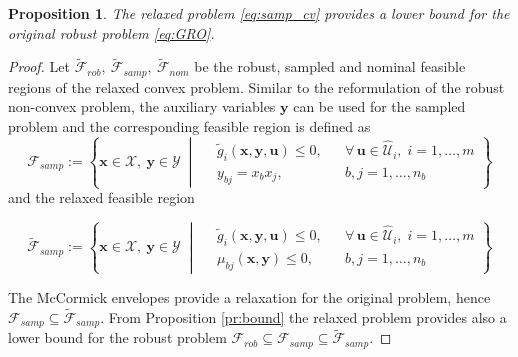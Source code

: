 \documentclass[sn-mathphys-num]{sn-jnl}
\newtheorem{proposition}{Proposition}
\begin{document}
\begin{proposition}
    The relaxed problem \eqref{eq:samp_cv} provides a lower bound for the original robust problem \eqref{eq:GRO}.
\end{proposition}
\begin{proof}
Let $\tilde{\mathcal{F}}_{rob},~\tilde{\mathcal{F}}_{samp},~\tilde{\mathcal{F}}_{nom}$ be the robust, sampled and nominal feasible regions of the relaxed convex problem. Similar to the reformulation of the robust non-convex problem, the auxiliary variables $\bm y$ can be used for the sampled problem and the corresponding feasible region is defined as 
\begin{equation*}
    \mathcal{F}_{samp}:=\left\{\bm x\in \mathcal{X},~ \bm y \in \mathcal{Y} \;\middle|\;
\begin{aligned}
& \tilde{g}_i(\bm{x}, \bm{y}, \bm{u}) \le 0, && \forall\, \bm{u} \in \hat{\mathcal{U}}_i,\; i = 1, \dots, m \\
& y_{bj} = x_b x_j, && b,j = 1, \dots, n_b
\end{aligned}
\right\}
\end{equation*}
and the relaxed feasible region

\begin{equation*}
    \tilde{\mathcal{F}}_{samp}:=\left\{\bm x\in \mathcal{X},~ \bm y \in \mathcal{Y} \;\middle|\;
\begin{aligned}
& \tilde{g}_i(\bm{x}, \bm{y}, \bm{u}) \le 0, && \forall\, \bm{u} \in \hat{\mathcal{U}}_i,\; i = 1, \dots, m \\
& \mu_{bj}(\bm x,\bm y)\leq 0, && b,j = 1, \dots, n_b
\end{aligned}
\right\}
\end{equation*}

The McCormick envelopes provide a relaxation for the original problem, hence $\mathcal{F}_{samp}\subseteq\tilde{\mathcal{F}}_{samp}$. From Proposition \ref{pr:bound} the relaxed problem provides also a lower bound for the robust problem $\mathcal{F}_{rob}\subseteq \mathcal{F}_{samp} \subseteq \tilde{\mathcal{F}}_{samp}$.    
\end{proof}
\end{document}
